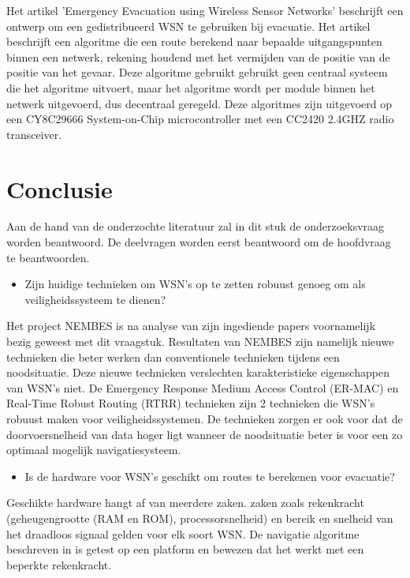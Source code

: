 Het artikel 'Emergency Evacuation using Wireless Sensor Networks'\cite{BarnesEmEv} beschrijft een ontwerp om een gedistribueerd WSN te gebruiken bij evacuatie. Het artikel beschrijft een algoritme die een route berekend naar bepaalde uitgangspunten binnen een netwerk, rekening houdend met het vermijden van de positie van de positie van het gevaar. Deze algoritme gebruikt gebruikt geen centraal systeem die het algoritme uitvoert, maar het algoritme wordt per module binnen het netwerk uitgevoerd, dus decentraal geregeld. Deze algoritmes zijn uitgevoerd op een CY8C29666 System-on-Chip microcontroller met een CC2420 2.4GHZ radio transceiver. 

\section{Conclusie}
Aan de hand van de onderzochte literatuur zal in dit stuk de onderzoeksvraag worden beantwoord. De deelvragen worden eerst beantwoord om de hoofdvraag te beantwoorden.

\begin{itemize}
\item Zijn huidige technieken om WSN's op te zetten robuust genoeg om als veiligheidssysteem te dienen?
\end{itemize}

Het project NEMBES is na analyse van zijn ingediende papers voornamelijk bezig geweest met dit vraagstuk. Resultaten van NEMBES zijn namelijk nieuwe technieken die beter werken dan conventionele technieken tijdens een noodsituatie. Deze nieuwe technieken verslechten karakteristieke eigenschappen van WSN's niet. De Emergency Response Medium Access Control (ER-MAC) en Real-Time Robust Routing (RTRR) technieken zijn 2 technieken die WSN's robuust maken voor veiligheidssystemen. De technieken zorgen er ook voor dat de doorvoersnelheid van data hoger ligt wanneer de noodsituatie beter is voor een zo optimaal mogelijk navigatiesysteem.

\begin{itemize}
\item Is de hardware voor WSN's geschikt om routes te berekenen voor evacuatie?
\end{itemize}

Geschikte hardware hangt af van meerdere zaken. zaken zoals rekenkracht (geheugengrootte (RAM en ROM), processorsnelheid) en bereik en snelheid van het draadloos signaal gelden voor elk soort WSN. De navigatie algoritme beschreven in \cite{BarnesEmEv} is getest op een platform en bewezen dat het werkt met een beperkte rekenkracht. 

